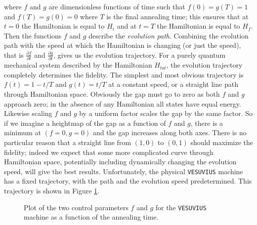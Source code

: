 where $f$ and $g$ are dimensionless functions of time such that $f(0) = g(T) = 1$ and $f(T) = g(0) = 0$ where $T$ is the final annealing time; this ensures that at $t = 0$ the Hamiltonian is equal to $H_i$ and at $t = T$ the Hamiltonian is equal to $H_f$.  Then the functions $f$ and $g$ describe the \emph{evolution path}.  Combining the evolution path with the speed at which the Hamiltonian is changing (or just the speed), that is $\frac{\partial f}{\partial t}$ and $\frac{\partial g}{\partial t}$, gives us the evolution trajectory.  For a purely quantum mechanical system described by the Hamiltonian $H_{tot}$, the evolution trajectory completely determines the fidelity.
The simplest and most obvious trajectory is $f(t) = 1 - t/T$ and $g(t) = t/T$ at a constant speed, or a straight line path through Hamiltonian space.
Obviously the gap must go to zero as both $f$ and $g$ approach zero; in the absence of any Hamiltonian all states have equal energy.  Likewise scaling $f$ and $g$ by a uniform factor scales the gap by the same factor.  So if we imagine a heightmap of the gap as a function of $f$ and $g$, there is a minimum at $(f=0,g=0)$ and the gap increases along both axes.  
There is no particular reason that a straight line from $(1,0)$ to $(0,1)$ should maximize the fidelity; indeed we expect that some more complicated curve through Hamiltonian space, potentially including dynamically changing the evolution speed, will give the best results.
Unfortunately, the physical \texttt{VESUVIUS} machine has a fixed trajectory, with the path and the evolution speed predetermined.  This trajectory is shown in Figure \ref{fig:trajectory}.

\begin{figure}
	\caption[\texttt{VESUVIUS Evolution Trajectory}]{Plot of the two control parameters $f$ and $g$ for the \texttt{VESUVIUS} machine as a function of the annealing time.}
	\label{fig:trajectory}
\end{figure}
